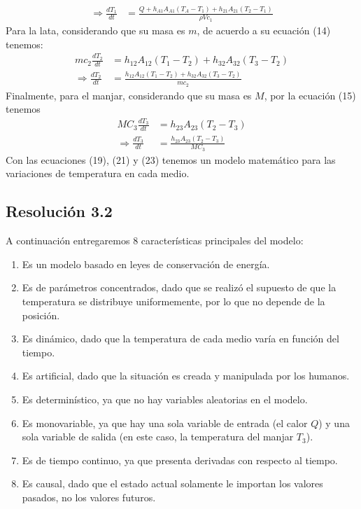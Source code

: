 \documentclass[
  11pt,
  letterpaper,
   addpoints,
   answers
  ]{exam}
\begin{document}
\begin{questions}
\begin{solution}
\begin{align}
    \Rightarrow \frac{dT_1}{dt} &= \frac{Q + h_{A1}A_{A1} (T_A - T_1) + h_{21}A_{21} (T_2 - T_1)}{\rho V c_1} \tag{19}
    \end{align}
Para la lata, considerando que su masa es $m$, de acuerdo a su ecuación (14) tenemos:
\begin{align}
    mc_2 \frac{dT_2}{dt} &= h_{12}A_{12} (T_1 - T_2) + h_{32}A_{32} (T_3 - T_2) \tag{20} \\
    \Rightarrow \frac{dT_2}{dt} &= \frac{h_{12}A_{12} (T_1 - T_2) + h_{32}A_{32} (T_3 - T_2)}{mc_2} \tag{21}
\end{align}
Finalmente, para el manjar, considerando que su masa es $M$, por la ecuación (15) tenemos
\begin{align}
    MC_3 \frac{dT_3}{dt} &= h_{23}A_{23} (T_2 - T_3) \tag{22} \\
    \Rightarrow \frac{dT_3}{dt} &= \frac{h_{23}A_{23} (T_2 - T_3)}{MC_3} \tag{23}
\end{align}
Con las ecuaciones (19), (21) y (23) tenemos un modelo matemático para las variaciones de temperatura en cada medio.
\subsection*{Resolución 3.2}
A continuación entregaremos 8 características principales del modelo:
\begin{enumerate}
    \item Es un modelo basado en leyes de conservación de energía.
    \item Es de parámetros concentrados, dado que se realizó el supuesto de que la temperatura se distribuye uniformemente, por lo que no depende de la posición.
    \item Es dinámico, dado que la temperatura de cada medio varía en función del tiempo.
    \item Es artificial, dado que la situación es creada y manipulada por los humanos.
    \item Es determinístico, ya que no hay variables aleatorias en el modelo.
    \item Es monovariable, ya que hay una sola variable de entrada (el calor $Q$) y una sola variable de salida (en este caso, la temperatura del manjar $T_3$).
    \item Es de tiempo continuo, ya que presenta derivadas con respecto al tiempo.
    \item Es causal, dado que el estado actual solamente le importan los valores pasados, no los valores futuros.
\end{enumerate}


\end{solution}
\end{questions}
\end{document}
